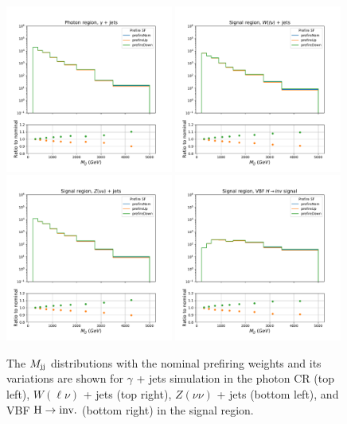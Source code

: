 \begin{figure}[htbp]
  \centering
    \includegraphics[width=0.49\textwidth]{ScaleFactors/Prefire/cr_g_vbf.pdf}
    \includegraphics[width=0.49\textwidth]{ScaleFactors/Prefire/sr_vbf_qcd_wlv.pdf} \\
    \includegraphics[width=0.49\textwidth]{ScaleFactors/Prefire/sr_vbf_qcd_zvv.pdf}
    \includegraphics[width=0.49\textwidth]{ScaleFactors/Prefire/sr_vbf_vbfhinv.pdf}
    \caption{The $M_{\textrm{jj}}$ distributions with the nominal prefiring weights and its variations
    are shown for $\gamma$ + jets simulation in the photon CR (top left), $W(\ell\nu)$ + jets (top right),
    $Z(\nu\nu)$ + jets (bottom left), and VBF $\textrm{H} \rightarrow \textrm{inv.}$ (bottom right) in the signal region.}
    \label{fig:prefiring_2}
\end{figure}

